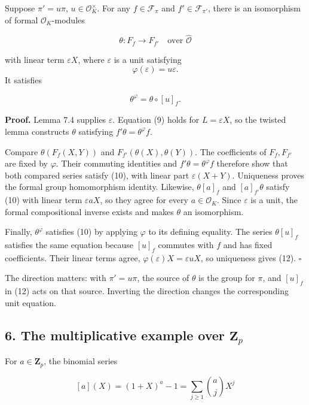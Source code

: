 \documentclass[11pt,a4paper]{article}
\begin{document}
Suppose \(\pi'=u\pi\), \(u\in\mathcal O_K^\times\). For any
\(f\in\mathcal F_\pi\) and \(f'\in\mathcal F_{\pi'}\), there is an
isomorphism of formal \(\mathcal O_K\)-modules

\[
\theta:F_f\longrightarrow F_{f'}
\quad\text{over }\widehat{\mathcal O}
\]

with linear term \(\varepsilon X\), where \(\varepsilon\) is a unit
satisfying \[
\varphi(\varepsilon)=u\varepsilon.
\] It satisfies

\[
\theta^\varphi=\theta\circ[u]_f.
\tag{12}
\]

\textbf{Proof.} Lemma 7.4 supplies \(\varepsilon\). Equation (9) holds
for \(L=\varepsilon X\), so the twisted lemma constructs \(\theta\)
satisfying \(f'\theta=\theta^\varphi f\).

Compare \(\theta(F_f(X,Y))\) and \(F_{f'}(\theta(X),\theta(Y))\). The
coefficients of \(F_f,F_{f'}\) are fixed by \(\varphi\). Their commuting
identities and \(f'\theta=\theta^\varphi f\) therefore show that both
compared series satisfy (10), with linear part \(\varepsilon(X+Y)\).
Uniqueness proves the formal group homomorphism identity. Likewise,
\(\theta[a]_f\) and \([a]_{f'}\theta\) satisfy (10) with linear term
\(\varepsilon aX\), so they agree for every \(a\in\mathcal O_K\). Since
\(\varepsilon\) is a unit, the formal compositional inverse exists and
makes \(\theta\) an isomorphism.

Finally, \(\theta^\varphi\) satisfies (10) by applying \(\varphi\) to
its defining equality. The series \(\theta[u]_f\) satisfies the same
equation because \([u]_f\) commutes with \(f\) and has fixed
coefficients. Their linear terms agree,
\(\varphi(\varepsilon)X=\varepsilon uX\), so uniqueness gives (12).
\(\square\)

The direction matters: with \(\pi'=u\pi\), the source of \(\theta\) is
the group for \(\pi\), and \([u]_f\) in (12) acts on that source.
Inverting the direction changes the corresponding unit equation.

\subsection{\texorpdfstring{6. The multiplicative example over
\(\mathbf Z_p\)}{6. The multiplicative example over \textbackslash mathbf Z\_p}}\label{the-multiplicative-example-over-mathbf-z_p}

For \(a\in\mathbf Z_p\), the binomial series

\[
[a](X)=(1+X)^a-1=\sum_{j\geq1}\binom aj X^j
\tag{13}
\]
\end{document}
